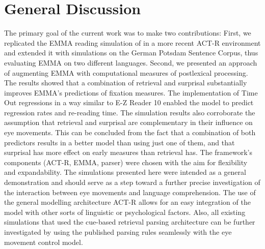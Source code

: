 \section{General Discussion}
The primary goal of the current work was to make two contributions:
First, we replicated the EMMA reading simulation of \cite{Salvucci2001} in a more recent ACT-R environment and extended it with simulations on the German Potsdam Sentence Corpus, thus evaluating EMMA on two different languages. 
Second, we presented an approach of augmenting EMMA with computational measures of postlexical processing.  The results showed that a combination of retrieval and surprisal substantially improves EMMA's predictions of fixation measures.  The implementation of Time Out regressions \cite{MitchellEtAl2008} in a way similar to E-Z Reader 10 enabled the model to predict regression rates and re-reading time. 
The simulation results also corroborate the assumption that retrieval and surprisal are complementary in their influence on eye movements.  This can be concluded from the fact that a combination of both predictors results in a better model than using just one of them, and that surprisal has more effect on early measures than retrieval has.
The framework's components (ACT-R, EMMA, parser) were chosen with the aim for flexibility and expandability.  The simulations presented here were intended as a general demonstration and should serve as a step toward a further precise investigation of the interaction between eye movements and language comprehension.  The use of the general modelling architecture ACT-R allows for an easy integration of the model with other sorts of linguistic or psychological factors.  Also, all existing simulations that used the cue-based retrieval parsing architecture \citep[e.g.,][]{LewisVasishth2005,VasishthLewis2006,VasishthBruessowLewis2008} can be further investigated by using the published parsing rules seamlessly with the eye movement control model.  

